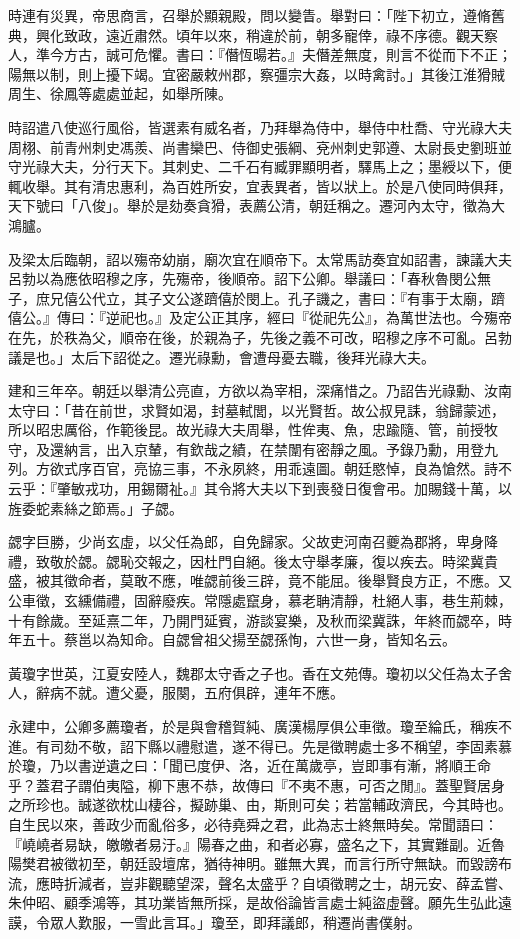 \begin{pinyinscope}
時連有災異，帝思商言，召舉於顯親殿，問以變眚。舉對曰：「陛下初立，遵脩舊典，興化致政，遠近肅然。頃年以來，稍違於前，朝多寵倖，祿不序德。觀天察人，準今方古，誠可危懼。書曰：『僭恆暘若。』夫僭差無度，則言不從而下不正；陽無以制，則上擾下竭。宜密嚴敕州郡，察彊宗大姦，以時禽討。」其後江淮猾賊周生、徐鳳等處處並起，如舉所陳。

時詔遣八使巡行風俗，皆選素有威名者，乃拜舉為侍中，舉侍中杜喬、守光祿大夫周栩、前青州刺史馮羨、尚書欒巴、侍御史張綱、兗州刺史郭遵、太尉長史劉班並守光祿大夫，分行天下。其刺史、二千石有臧罪顯明者，驛馬上之；墨綬以下，便輒收舉。其有清忠惠利，為百姓所安，宜表異者，皆以狀上。於是八使同時俱拜，天下號曰「八俊」。舉於是劾奏貪猾，表薦公清，朝廷稱之。遷河內太守，徵為大鴻臚。

及梁太后臨朝，詔以殤帝幼崩，廟次宜在順帝下。太常馬訪奏宜如詔書，諫議大夫呂勃以為應依昭穆之序，先殤帝，後順帝。詔下公卿。舉議曰：「春秋魯閔公無子，庶兄僖公代立，其子文公遂躋僖於閔上。孔子譏之，書曰：『有事于太廟，躋僖公。』傳曰：『逆祀也。』及定公正其序，經曰『從祀先公』，為萬世法也。今殤帝在先，於秩為父，順帝在後，於親為子，先後之義不可改，昭穆之序不可亂。呂勃議是也。」太后下詔從之。遷光祿勳，會遭母憂去職，後拜光祿大夫。

建和三年卒。朝廷以舉清公亮直，方欲以為宰相，深痛惜之。乃詔告光祿勳、汝南太守曰：「昔在前世，求賢如渴，封墓軾閭，以光賢哲。故公叔見誄，翁歸蒙述，所以昭忠厲俗，作範後昆。故光祿大夫周舉，性侔夷、魚，忠踰隨、管，前授牧守，及還納言，出入京輦，有欽哉之績，在禁闈有密靜之風。予錄乃勳，用登九列。方欲式序百官，亮協三事，不永夙終，用乖遠圖。朝廷愍悼，良為愴然。詩不云乎：『肇敏戎功，用錫爾祉。』其令將大夫以下到喪發日復會弔。加賜錢十萬，以旌委蛇素絲之節焉。」子勰。

勰字巨勝，少尚玄虛，以父任為郎，自免歸家。父故吏河南召夔為郡將，卑身降禮，致敬於勰。勰恥交報之，因杜門自絕。後太守舉孝廉，復以疾去。時梁冀貴盛，被其徵命者，莫敢不應，唯勰前後三辟，竟不能屈。後舉賢良方正，不應。又公車徵，玄纁備禮，固辭廢疾。常隱處竄身，慕老聃清靜，杜絕人事，巷生荊棘，十有餘歲。至延熹二年，乃開門延賓，游談宴樂，及秋而梁冀誅，年終而勰卒，時年五十。蔡邕以為知命。自勰曾祖父揚至勰孫恂，六世一身，皆知名云。

黃瓊字世英，江夏安陸人，魏郡太守香之子也。香在文苑傳。瓊初以父任為太子舍人，辭病不就。遭父憂，服闋，五府俱辟，連年不應。

永建中，公卿多薦瓊者，於是與會稽賀純、廣漢楊厚俱公車徵。瓊至綸氏，稱疾不進。有司劾不敬，詔下縣以禮慰遣，遂不得已。先是徵聘處士多不稱望，李固素慕於瓊，乃以書逆遺之曰：「聞已度伊、洛，近在萬歲亭，豈即事有漸，將順王命乎？蓋君子謂伯夷隘，柳下惠不恭，故傳曰『不夷不惠，可否之閒』。蓋聖賢居身之所珍也。誠遂欲枕山棲谷，擬跡巢、由，斯則可矣；若當輔政濟民，今其時也。自生民以來，善政少而亂俗多，必待堯舜之君，此為志士終無時矣。常聞語曰：『嶢嶢者易缺，皦皦者易汙。』陽春之曲，和者必寡，盛名之下，其實難副。近魯陽樊君被徵初至，朝廷設壇席，猶待神明。雖無大異，而言行所守無缺。而毀謗布流，應時折減者，豈非觀聽望深，聲名太盛乎？自頃徵聘之士，胡元安、薛孟嘗、朱仲昭、顧季鴻等，其功業皆無所採，是故俗論皆言處士純盜虛聲。願先生弘此遠謨，令眾人歎服，一雪此言耳。」瓊至，即拜議郎，稍遷尚書僕射。


\end{pinyinscope}
